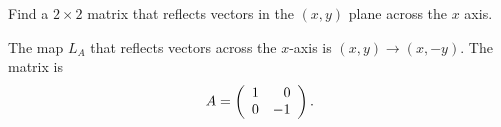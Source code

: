 \documentclass{ximera}
\begin{document}
\begin{exercise} \label{c4.2.2a}
Find a $2\times 2$ matrix that reflects vectors in the $(x,y)$ plane across
the $x$ axis.

\begin{solution}
The map $L_A$ that reflects vectors across the $x$-axis is
$(x,y) \rightarrow (x,-y)$.  The matrix is
\[
A = \left(\begin{array}{rr} 1 & 0\\ 0 &-1\end{array}\right).
\]

\end{solution}
\end{exercise}
\end{document}
